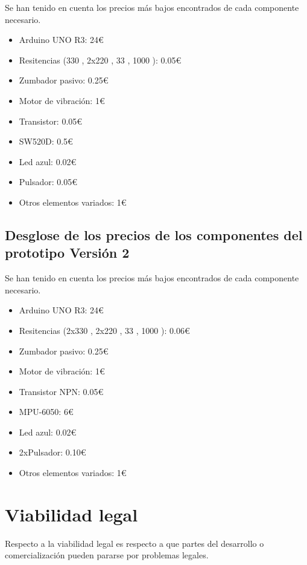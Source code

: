 Se han tenido en cuenta los precios más bajos encontrados de cada componente necesario.
\begin{itemize}
    \item Arduino UNO R3: 24€
    \item Resitencias (330 \textOmega, 2x220 \textOmega, 33 \textOmega, 1000 \textOmega): 0.05€
    \item Zumbador pasivo: 0.25€
    \item Motor de vibración: 1€
    \item Transistor: 0.05€
    \item SW520D: 0.5€
    \item Led azul: 0.02€
    \item Pulsador: 0.05€
    \item Otros elementos variados: 1€
    
\end{itemize}

\subsection{Desglose de los precios de los componentes del prototipo Versión 2}

Se han tenido en cuenta los precios más bajos encontrados de cada componente necesario.
\begin{itemize}
    \item Arduino UNO R3: 24€
    \item Resitencias (2x330 \textOmega, 2x220 \textOmega, 33 \textOmega, 1000 \textOmega): 0.06€
    \item Zumbador pasivo: 0.25€
    \item Motor de vibración: 1€
    \item Transistor NPN: 0.05€
    \item MPU-6050: 6€
    \item Led azul: 0.02€
    \item 2xPulsador: 0.10€
    \item Otros elementos variados: 1€
    
\end{itemize}




\section{Viabilidad legal}

Respecto a la viabilidad legal es respecto a que partes del desarrollo o comercialización  pueden pararse por problemas legales.

